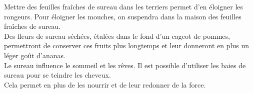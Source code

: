 {    Mettre des feuilles fraîches de sureau dans les terriers permet d’en éloigner les rongeurs. 
    Pour éloigner les mouches, on suspendra dans la maison des feuilles fraîches de sureau.\\

    Des fleurs de sureau séchées, étalées dans le fond d’un cageot de pommes, permettront de conserver ces fruits plus longtemps 
    et leur donneront en plus un léger goût d’ananas.\\

    Le sureau influence le sommeil et les rêves.
    Il est possible d’utiliser les baies de sureau pour se teindre les cheveux. \\
    Cela permet en plus de les nourrir et de leur redonner de la force.
}